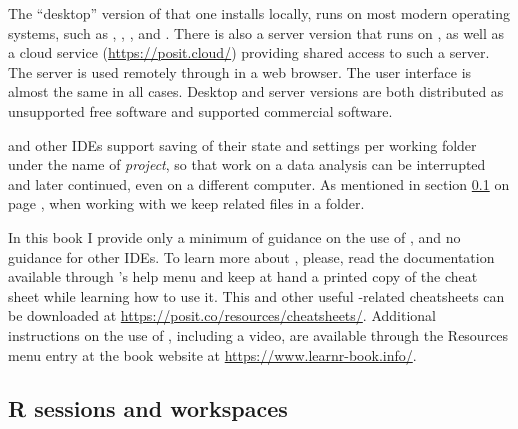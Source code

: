 \documentclass[krantz2]{krantz}\usepackage{knitr}
\begin{document}
The ``desktop'' version of \RStudio that one installs locally, runs on most modern operating systems, such as , , , and . There is also a server version that runs on , as well as a cloud service (\url{https://posit.cloud/}) providing shared access to such a server. The \RStudio server is used remotely through in a web browser. The user interface is almost the same in all cases. Desktop and server versions are both distributed as unsupported free software and supported commercial software.

\RStudio and other IDEs support saving of their state and settings per working folder under the name of \emph{project}, so that work on a data analysis can be interrupted and later continued, even on a different computer. As mentioned in section \ref{sec:R:workspace} on page \pageref{sec:R:workspace}, when working with \Rlang we keep related files in a folder.

\begin{infobox}
  In this book I provide only a minimum of guidance on the use of \RStudio, and no guidance for other IDEs. To learn more about \RStudio, please, read the documentation available through \RStudio's help menu and keep at hand a printed copy of the \RStudio cheat sheet while learning how to use it. This and other useful \Rlang-related cheatsheets can be downloaded at \url{https://posit.co/resources/cheatsheets/}. Additional instructions on the use of \RStudio, including a video, are available through the Resources menu entry at the book website at \url{https://www.learnr-book.info/}.
\end{infobox}

\subsection{R sessions and workspaces}\label{sec:R:workspace}
\end{document}
